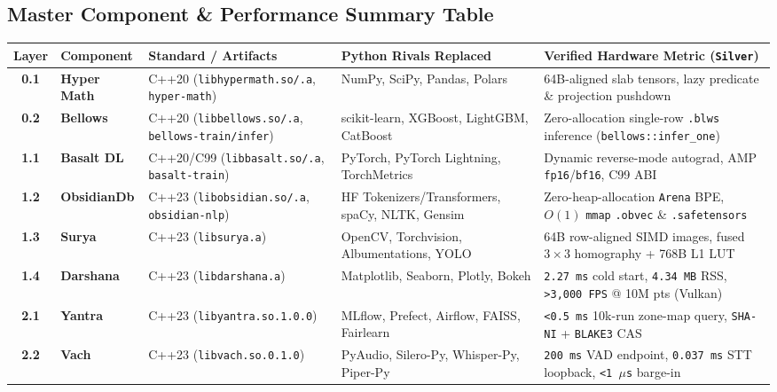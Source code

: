 \documentclass[11pt,a4paper]{article}
\begin{document}
\subsection{Master Component \& Performance Summary Table}

\begin{small}
\begin{tabularx}{\textwidth}{cllYY}
\toprule
\textbf{Layer} & \textbf{Component} & \textbf{Standard / Artifacts} & \textbf{Python Rivals Replaced} & \textbf{Verified Hardware Metric (\texttt{Silver})} \\
\midrule
\textbf{0.1} & \textbf{Hyper Math} & C++20 (\texttt{libhypermath.so/.a}, \texttt{hyper-math}) & NumPy, SciPy, Pandas, Polars & 64B-aligned slab tensors, lazy predicate \& projection pushdown \\
\addlinespace[2pt]
\textbf{0.2} & \textbf{Bellows} & C++20 (\texttt{libbellows.so/.a}, \texttt{bellows-train/infer}) & scikit-learn, XGBoost, LightGBM, CatBoost & Zero-allocation single-row \texttt{.blws} inference (\texttt{bellows::infer\_one}) \\
\addlinespace[2pt]
\textbf{1.1} & \textbf{Basalt DL} & C++20/C99 (\texttt{libbasalt.so/.a}, \texttt{basalt-train}) & PyTorch, PyTorch Lightning, TorchMetrics & Dynamic reverse-mode autograd, AMP \texttt{fp16}/\texttt{bf16}, C99 ABI \\
\addlinespace[2pt]
\textbf{1.2} & \textbf{ObsidianDb} & C++23 (\texttt{libobsidian.so/.a}, \texttt{obsidian-nlp}) & HF Tokenizers/Transformers, spaCy, NLTK, Gensim & Zero-heap-allocation \texttt{Arena} BPE, $O(1)$ \texttt{mmap} \texttt{.obvec} \& \texttt{.safetensors} \\
\addlinespace[2pt]
\textbf{1.3} & \textbf{Surya} & C++23 (\texttt{libsurya.a}) & OpenCV, Torchvision, Albumentations, YOLO & 64B row-aligned SIMD images, fused $3\times 3$ homography + 768B L1 LUT \\
\addlinespace[2pt]
\textbf{1.4} & \textbf{Darshana} & C++23 (\texttt{libdarshana.a}) & Matplotlib, Seaborn, Plotly, Bokeh & \texttt{2.27 ms} cold start, \texttt{4.34 MB} RSS, \texttt{>3,000 FPS} @ 10M pts (Vulkan) \\
\addlinespace[2pt]
\textbf{2.1} & \textbf{Yantra} & C++23 (\texttt{libyantra.so.1.0.0}) & MLflow, Prefect, Airflow, FAISS, Fairlearn & \texttt{<0.5 ms} 10k-run zone-map query, \texttt{SHA-NI} + \texttt{BLAKE3} CAS \\
\addlinespace[2pt]
\textbf{2.2} & \textbf{Vach} & C++23 (\texttt{libvach.so.0.1.0}) & PyAudio, Silero-Py, Whisper-Py, Piper-Py & \texttt{200 ms} VAD endpoint, \texttt{0.037 ms} STT loopback, \texttt{<1 $\mu$s} barge-in \\

\end{tabularx}
\end{small}
\end{document}
